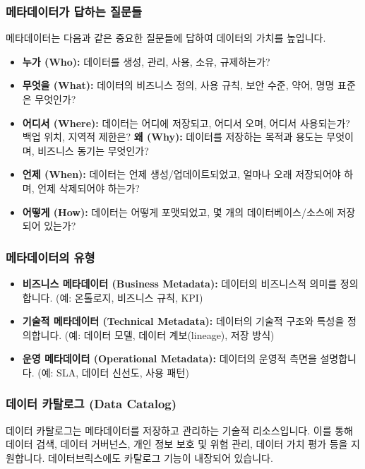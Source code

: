 \documentclass[11pt,a4paper]{article}
\theoremstyle{definition}
\begin{document}
\subsubsection{메타데이터가 답하는 질문들}
메타데이터는 다음과 같은 중요한 질문들에 답하여 데이터의 가치를 높입니다.
\begin{itemize}
    \item \textbf{누가 (Who):} 데이터를 생성, 관리, 사용, 소유, 규제하는가?
    \item \textbf{무엇을 (What):} 데이터의 비즈니스 정의, 사용 규칙, 보안 수준, 약어, 명명 표준은 무엇인가?
    \item \textbf{어디서 (Where):} 데이터는 어디에 저장되고, 어디서 오며, 어디서 사용되는가? 백업 위치, 지역적 제한은?
    \textbf{왜 (Why):} 데이터를 저장하는 목적과 용도는 무엇이며, 비즈니스 동기는 무엇인가?
    \item \textbf{언제 (When):} 데이터는 언제 생성/업데이트되었고, 얼마나 오래 저장되어야 하며, 언제 삭제되어야 하는가?
    \item \textbf{어떻게 (How):} 데이터는 어떻게 포맷되었고, 몇 개의 데이터베이스/소스에 저장되어 있는가?
\end{itemize}

\subsubsection{메타데이터의 유형}
\begin{itemize}
    \item \textbf{비즈니스 메타데이터 (Business Metadata):} 데이터의 비즈니스적 의미를 정의합니다. (예: 온톨로지, 비즈니스 규칙, KPI)
    \item \textbf{기술적 메타데이터 (Technical Metadata):} 데이터의 기술적 구조와 특성을 정의합니다. (예: 데이터 모델, 데이터 계보(lineage), 저장 방식)
    \item \textbf{운영 메타데이터 (Operational Metadata):} 데이터의 운영적 측면을 설명합니다. (예: SLA, 데이터 신선도, 사용 패턴)
\end{itemize}

\subsubsection{데이터 카탈로그 (Data Catalog)}
데이터 카탈로그는 메타데이터를 저장하고 관리하는 기술적 리소스입니다. 이를 통해 데이터 검색, 데이터 거버넌스, 개인 정보 보호 및 위험 관리, 데이터 가치 평가 등을 지원합니다. 데이터브릭스에도 카탈로그 기능이 내장되어 있습니다.
\end{document}
